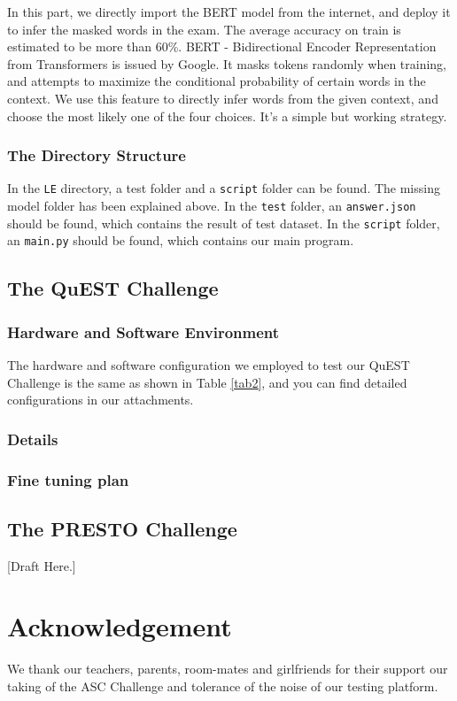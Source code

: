 \documentclass[a4paper, 11pt]{article}
\begin{document}
				In this part, we directly import the BERT\cite{devlin2018bert} model from the internet, and deploy it to infer the masked words in the exam. The average accuracy on train is estimated to be more than 60\%. 
				BERT - Bidirectional Encoder Representation from Transformers is issued by Google. It masks tokens randomly when training, and attempts to maximize the conditional probability of certain words in the context. We use this feature to directly infer words from the given context, and choose the most likely one of the four choices. It's a simple but working strategy. 
				
			\subsubsection{The Directory Structure}
				In the \texttt{LE} directory, a test folder and a \texttt{script} folder can be found. The missing model folder has been explained above. In the \texttt{test} folder, an \texttt{answer.json} should be found, which contains the result of test dataset. In the \texttt{script} folder, an \texttt{main.py} should be found, which contains our main program. 
		\subsection{The QuEST Challenge} 
		
			\subsubsection{Hardware and Software Environment}
			
				The hardware and software configuration we employed to test our QuEST Challenge is the same as shown in Table \ref{tab2}, and you can find detailed configurations in our attachments.

			\subsubsection{Details}
			
				
				

			
			\subsubsection{Fine tuning plan}

		\subsection{The PRESTO Challenge} [Draft Here.]

	\section*{Acknowledgement} We thank our teachers, parents, room-mates and girlfriends for their support our taking of the ASC Challenge and tolerance of the noise of our testing platform.



\end{document}
